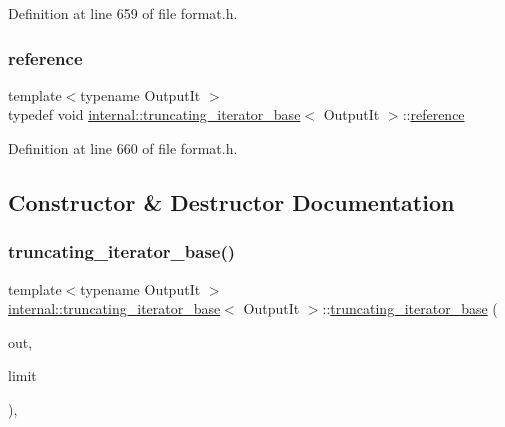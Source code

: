 Definition at line 659 of file format.\+h.

\mbox{\label{classinternal_1_1truncating__iterator__base_ae3802d66130989a3717422e196ca4a92}} 
\subsubsection{\texorpdfstring{reference}{reference}}
{\footnotesize\ttfamily template$<$typename Output\+It $>$ \\
typedef void \hyperlink{classinternal_1_1truncating__iterator__base}{internal\+::truncating\+\_\+iterator\+\_\+base}$<$ Output\+It $>$\+::\hyperlink{classinternal_1_1truncating__iterator__base_ae3802d66130989a3717422e196ca4a92}{reference}}



Definition at line 660 of file format.\+h.



\subsection{Constructor \& Destructor Documentation}
\mbox{\label{classinternal_1_1truncating__iterator__base_a2258c919b872d848184e9fc1b7dbdf3a}} 
\subsubsection{\texorpdfstring{truncating\+\_\+iterator\+\_\+base()}{truncating\_iterator\_base()}}
{\footnotesize\ttfamily template$<$typename Output\+It $>$ \\
\hyperlink{classinternal_1_1truncating__iterator__base}{internal\+::truncating\+\_\+iterator\+\_\+base}$<$ Output\+It $>$\+::\hyperlink{classinternal_1_1truncating__iterator__base}{truncating\+\_\+iterator\+\_\+base} (\begin{DoxyParamCaption}\item[{Output\+It}]{out,  }\item[{std\+::size\+\_\+t}]{limit }\end{DoxyParamCaption})\hspace{0.3cm}{\ttfamily [inline]}, {\ttfamily [protected]}}



